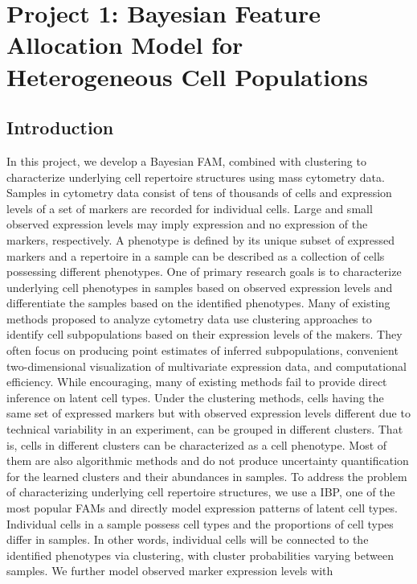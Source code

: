 \documentclass[12pt,]{article}
\begin{document}
\section{Project 1: Bayesian Feature Allocation Model for Heterogeneous Cell Populations}\label{sec:proj1}
\subsection{Introduction}


In this project, we develop a Bayesian FAM, combined with clustering to characterize underlying cell repertoire structures using mass cytometry data. Samples in cytometry data consist of tens of thousands of cells and expression levels of a set of markers are recorded for individual cells. Large and small observed expression levels may imply expression and no expression of the markers, respectively.  A phenotype is defined by its unique subset of expressed markers and a repertoire in a sample can be described as a collection of cells possessing different phenotypes.  One of primary research goals is to characterize underlying cell phenotypes in samples based on observed expression levels and differentiate the samples based on the identified phenotypes.  Many of existing methods proposed to analyze cytometry data use clustering approaches to identify cell subpopulations based on their expression levels of the makers.  They often focus on
producing point estimates of inferred subpopulations, convenient two-dimensional visualization of multivariate expression data, and
computational efficiency. 
While encouraging, many of existing methods fail to provide direct inference on latent cell types.  Under the clustering methods, cells having the same set of expressed markers but with observed expression levels different due to technical variability in an experiment, can be grouped in different clusters. That is, cells in different clusters can be characterized as a cell phenotype. Most of them are also algorithmic methods and do not produce uncertainty
quantification for the learned clusters and their abundances in samples. 
To address the problem of characterizing underlying cell repertoire structures, 
we use a IBP, one of the most popular FAMs and directly model expression patterns of latent cell types.   Individual cells in a sample possess cell types and the proportions of cell types differ in samples. In other words, individual cells will be connected to the identified phenotypes via clustering, with cluster probabilities varying between samples.  We further model observed marker expression levels with
\end{document}
